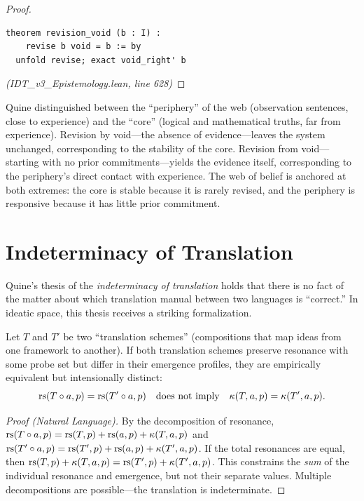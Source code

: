 \begin{proof}
\begin{lstlisting}
theorem revision_void (b : I) :
    revise b void = b := by
  unfold revise; exact void_right' b
\end{lstlisting}
\textit{(IDT\_v3\_Epistemology.lean, line 628)}
\end{proof}

\begin{interpretation}
Quine distinguished between the ``periphery'' of the web (observation sentences,
close to experience) and the ``core'' (logical and mathematical truths, far from
experience). Revision by void---the absence of evidence---leaves the system
unchanged, corresponding to the stability of the core. Revision from void---starting
with no prior commitments---yields the evidence itself, corresponding to the
periphery's direct contact with experience. The web of belief is anchored at
both extremes: the core is stable because it is rarely revised, and the
periphery is responsive because it has little prior commitment.
\end{interpretation}

\section{Indeterminacy of Translation}

Quine's thesis of the \emph{indeterminacy of translation} holds that there is no
fact of the matter about which translation manual between two languages is
``correct.'' In ideatic space, this thesis receives a striking formalization.

\begin{theorem}
\label{thm:indeterminacy-translation}
Let $T$ and $T'$ be two ``translation schemes'' (compositions that map ideas
from one framework to another). If both translation schemes preserve resonance
with some probe set but differ in their emergence profiles, they are
empirically equivalent but intensionally distinct:
\[
  \mathrm{rs}(T \circ a, p) = \mathrm{rs}(T' \circ a, p)
  \quad\text{does not imply}\quad
  \kappa(T, a, p) = \kappa(T', a, p).
\]
\end{theorem}

\begin{proof}[Proof (Natural Language)]
By the decomposition of resonance, $\mathrm{rs}(T \circ a, p) = \mathrm{rs}(T, p) + \mathrm{rs}(a, p)
+ \kappa(T, a, p)$ and $\mathrm{rs}(T' \circ a, p) = \mathrm{rs}(T', p) + \mathrm{rs}(a, p) +
\kappa(T', a, p)$. If the total resonances are equal, then $\mathrm{rs}(T, p) +
\kappa(T, a, p) = \mathrm{rs}(T', p) + \kappa(T', a, p)$. This constrains the
\emph{sum} of the individual resonance and emergence, but not their separate
values. Multiple decompositions are possible---the translation is indeterminate.
\end{proof}

